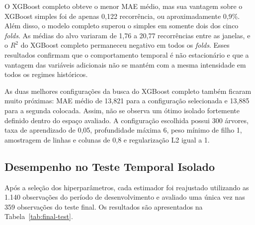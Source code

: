 O XGBoost completo obteve o menor MAE médio, mas sua vantagem sobre o XGBoost simples foi de apenas 0,122 recorrência, ou aproximadamente 0,9\%. Além disso, o modelo completo superou o simples em somente dois dos cinco \textit{folds}. As médias do alvo variaram de 1,76 a 20,77 recorrências entre as janelas, e o $R^2$ do XGBoost completo permaneceu negativo em todos os \textit{folds}. Esses resultados confirmam que o comportamento temporal é não estacionário e que a vantagem das variáveis adicionais não se mantém com a mesma intensidade em todos os regimes históricos.

As duas melhores configurações da busca do XGBoost completo também ficaram muito próximas: MAE médio de 13,821 para a configuração selecionada e 13,885 para a segunda colocada. Assim, não se observa um ótimo isolado fortemente definido dentro do espaço avaliado. A configuração escolhida possui 300 árvores, taxa de aprendizado de 0,05, profundidade máxima 6, peso mínimo de filho 1, amostragem de linhas e colunas de 0,8 e regularização L2 igual a 1.

\subsection{Desempenho no Teste Temporal Isolado}

Após a seleção dos hiperparâmetros, cada estimador foi reajustado utilizando as 1.140 observações do período de desenvolvimento e avaliado uma única vez nas 359 observações do teste final. Os resultados são apresentados na Tabela~\ref{tab:final-test}.

\begin{table}[htbp]
    \centering
    \caption{Desempenho no teste temporal isolado.}
    \label{tab:final-test}
\end{table}

